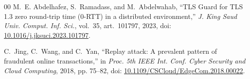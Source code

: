 \documentclass[conference]{IEEEtran}
\begin{document}
\begin{thebibliography}{00}
M.~E. Abdelhafez, S.~Ramadass, and M.~Abdelwahab, ``TLS Guard for TLS 1.3 zero round-trip time (0-RTT) in a distributed environment,'' \emph{J. King Saud Univ. Comput. Inf. Sci.}, vol.~35, art.~101797, 2023, doi: \href{https://doi.org/10.1016/j.jksuci.2023.101797}{10.1016/j.jksuci.2023.101797}.

C.~Jing, C.~Wang, and C.~Yan, ``Replay attack: A prevalent pattern of fraudulent online transactions,'' in \emph{Proc. 5th IEEE Int. Conf. Cyber Security and Cloud Computing}, 2018, pp. 75--82, doi: \href{https://doi.org/10.1109/CSCloud/EdgeCom.2018.00022}{10.1109/CSCloud/EdgeCom.2018.00022}. %

\end{thebibliography}
\end{document}
